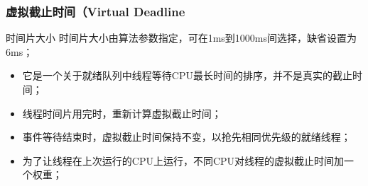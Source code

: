 % 
% 

\begin{frame}[fragile]
    \frametitle{虚拟截止时间（Virtual Deadline}
    \begin{block}{时间片大小}
    时间片大小由算法参数指定，可在1ms到1000ms间选择，缺省设置为6ms；
    \end{block} \pause

    \begin{itemize}
        \item 它是一个关于就绪队列中线程等待CPU最长时间的排序，并不是真实的截止时间； \pause
        \item 线程时间片用完时，重新计算虚拟截止时间；
        \item 事件等待结束时，虚拟截止时间保持不变，以抢先相同优先级的就绪线程； \pause
        \item 为了让线程在上次运行的CPU上运行，不同CPU对线程的虚拟截止时间加一个权重；
    \end{itemize}

\end{frame}

